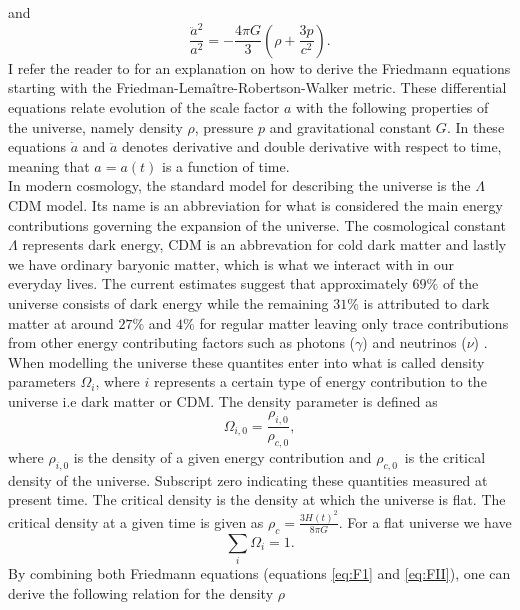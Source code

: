 and
\begin{equation}\label{eq:FII}
    \frac{\ddot{a}^2}{a^2} = -\frac{4\pi G}{3}(\rho + \frac{3p}{c^2}).
\end{equation}
I refer the reader to \cite[ch. 2]{Dodelson:1282338} for an explanation on how to derive the Friedmann equations starting with the Friedman-Lemaître-Robertson-Walker metric.
These differential equations relate evolution of the scale factor $a$ with the
following properties of the universe, namely density $\rho$, pressure $p$ and gravitational
constant $G$. In these equations $\dot{a}$ and $\ddot{a}$ denotes
derivative and double derivative with respect to time, meaning that $a=a(t)$ is a
function of time. \\

In modern cosmology, the standard model for describing the universe is the $\Lambda$CDM model. Its name is an abbreviation for what 
is considered the main energy contributions governing the expansion of the universe. The cosmological constant $\Lambda$ represents dark energy, CDM is an abbrevation for cold dark matter
and lastly we have ordinary baryonic matter, which is what we interact with in our
everyday lives. The current estimates suggest that approximately $69\%$ of the
universe consists of dark energy while the remaining $31\%$ is attributed to
dark matter at around 
$27\%$ and $4\%$ for regular matter leaving only trace contributions from other
energy contributing factors such as photons ($\gamma$) and neutrinos ($\nu$)
\cite{planckparameters}. When modelling the universe these quantites
enter into 
what is called density parameters $\Omega_i$, where $i$ represents a certain type of energy contribution to the universe i.e dark matter or CDM. The density parameter is defined as
\begin{equation}\label{eq:densityparameter}
    \Omega_{i,0} = \frac{\rho_{i,0}}{\rho_{c,0}},
\end{equation}
where $\rho_{i,0}$ is the density of a given energy contribution and $\rho_{c,0}$ is
the critical density of the universe. Subscript zero indicating these quantities
measured at present time. The critical density is the density at which the universe is flat. The critical density at a
given time is given as $\rho_c=\frac{3H(t)^2}{8\pi G}$. For a flat universe we have
\begin{equation}
    \sum_i \Omega_i = 1.
\end{equation}
By combining both Friedmann equations (equations \ref{eq:F1} and \ref{eq:FII}),
one can derive the following relation for the density $\rho$
